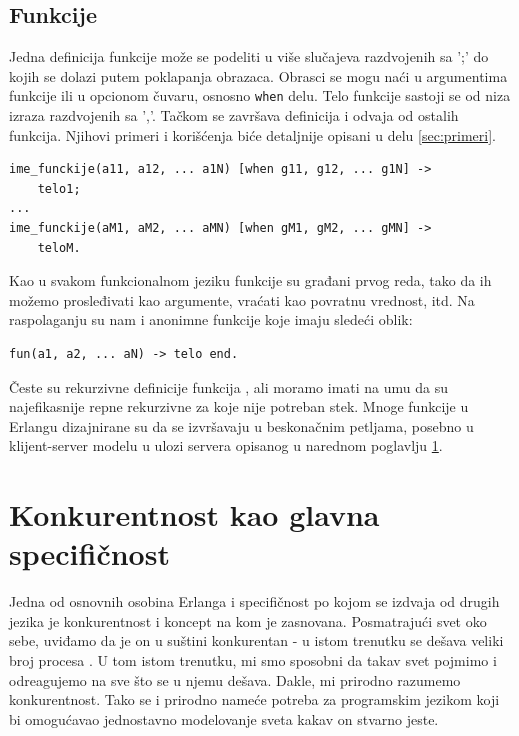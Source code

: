 \documentclass[a4paper]{article}
\begin{document}
\subsection{Funkcije}
Jedna definicija funkcije može se podeliti u više slučajeva
razdvojenih sa ';' do kojih se dolazi putem poklapanja obrazaca.
Obrasci se mogu naći u argumentima funkcije ili u opcionom čuvaru,
osnosno {\texttt{when}} delu. 
Telo funkcije sastoji se od niza izraza razdvojenih sa ','.
Tačkom se završava definicija i odvaja od ostalih funkcija. 
Njihovi primeri i korišćenja biće detaljnije opisani u delu \ref{sec:primeri}.
\begin{verbatim}
ime_funckije(a11, a12, ... a1N) [when g11, g12, ... g1N] -> 
	telo1;
...
ime_funckije(aM1, aM2, ... aMN) [when gM1, gM2, ... gMN] -> 
	teloM.
\end{verbatim}

Kao u svakom funkcionalnom jeziku funkcije su građani prvog reda, 
tako da ih možemo prosleđivati kao argumente, vraćati kao povratnu vrednost, itd. Na raspolaganju su nam i anonimne funkcije koje imaju sledeći oblik:
\begin{verbatim}
fun(a1, a2, ... aN) -> telo end.
\end{verbatim}

Česte su rekurzivne definicije funkcija \cite{book_joe}, 
ali moramo imati na umu da su najefikasnije repne rekurzivne za koje nije potreban stek. 
Mnoge funkcije u Erlangu dizajnirane su da se izvršavaju u beskonačnim petljama, 
posebno u klijent-server modelu u ulozi servera opisanog u narednom poglavlju \ref{sec:konkurentnost}.


\section{Konkurentnost kao glavna specifičnost}
\label{sec:konkurentnost}
Jedna od osnovnih osobina Erlanga i specifičnost po kojom se izdvaja od drugih jezika je konkurentnost i koncept na kom je zasnovana.
Posmatrajući svet oko
sebe, uviđamo da je on u suštini konkurentan - u istom trenutku se dešava veliki broj procesa \cite{phdthesis}. 
U tom istom trenutku, mi smo sposobni da takav svet pojmimo i odreagujemo na sve što se u njemu dešava. Dakle, mi prirodno razumemo konkurentnost.
Tako se i prirodno nameće potreba za programskim jezikom koji bi omogućavao jednostavno modelovanje sveta kakav on stvarno jeste.
\end{document}
